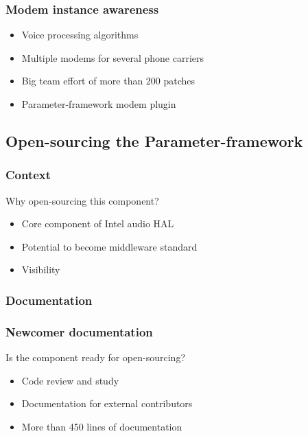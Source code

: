 \begin{frame}
    \frametitle{Modem instance awareness}
    \begin{itemize}
        \item Voice processing algorithms
        \item Multiple modems for several phone carriers
        \item Big team effort of more than 200 patches
        \item Parameter-framework modem plugin
    \end{itemize}
\end{frame}

\subsection{Open-sourcing the Parameter-framework}
\subsubsection{Context}
\begin{FrameWithSubSection}
    \begin{block}{Why open-sourcing this component?}
        \begin{itemize}
            \item Core component of Intel audio HAL
            \item Potential to become middleware standard
            \item Visibility
        \end{itemize}
    \end{block}
\end{FrameWithSubSection}

\subsubsection{Documentation}
\begin{frame}
    \frametitle{Newcomer documentation}
    \centering
    \begin{block}{Is the component ready for open-sourcing?}
        \begin{itemize}
            \item Code review and study
            \item Documentation for external contributors
            \item More than 450 lines of documentation
        \end{itemize}
    \end{block}
\end{frame}

